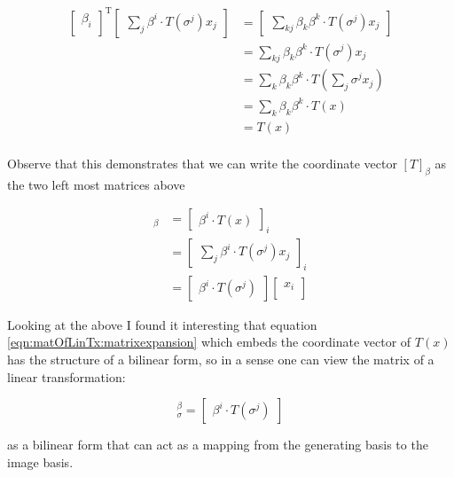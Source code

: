 \begin{align*}
{
\begin{bmatrix}
\beta_i \\
\end{bmatrix}
}^{\text{T}}
\begin{bmatrix}
\sum_j \beta^i \cdot T(\sigma^j) x_j
\end{bmatrix} 
&=
\begin{bmatrix}
\sum_{kj} \beta_k \beta^k \cdot T(\sigma^j) x_j
\end{bmatrix} \\
&=
\sum_{kj} \beta_k \beta^k \cdot T(\sigma^j) x_j \\
&=
\sum_{k} \beta_k \beta^k \cdot T(\sum_j \sigma^j x_j) \\
&=
\sum_{k} \beta_k \beta^k \cdot T(x) \\
&=
T(x) \\
\end{align*}

Observe that this demonstrates that we can write the coordinate vector $[T]_\beta$ as the two left most matrices above

\begin{align*}
[T(x)]_\beta 
&= 
{
\begin{bmatrix}
\beta^i \cdot T(x)
\end{bmatrix}
}_i \\
&= 
{
\begin{bmatrix}
\sum_{j} \beta^i \cdot T(\sigma^j) x_j
\end{bmatrix}
}_i \\
&=
\begin{bmatrix}
\beta^i \cdot T(\sigma^j)
\end{bmatrix}
\begin{bmatrix}
x_i \\
\end{bmatrix}
\end{align*}

Looking at the above I found it interesting that equation \ref{eqn:matOfLinTx:matrixexpansion} which embeds the coordinate vector of $T(x)$ has the structure of a bilinear form, so in a sense one can view the
matrix of a linear transformation:

\begin{equation}
[T]_\sigma^\beta = 
\begin{bmatrix}
\beta^i \cdot T(\sigma^j)
\end{bmatrix}
\end{equation}

as a bilinear form that can act as a mapping from the generating basis to the image basis.
